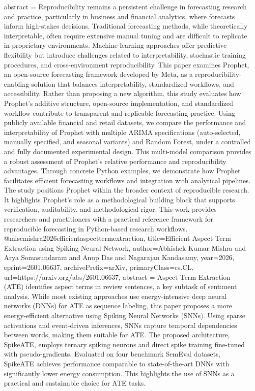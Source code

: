 {      abstract = {Reproducibility remains a persistent challenge in forecasting research and practice, particularly in business and financial analytics, where forecasts inform high-stakes decisions. Traditional forecasting methods, while theoretically interpretable, often require extensive manual tuning and are difficult to replicate in proprietary environments. Machine learning approaches offer predictive flexibility but introduce challenges related to interpretability, stochastic training procedures, and cross-environment reproducibility. This paper examines Prophet, an open-source forecasting framework developed by Meta, as a reproducibility-enabling solution that balances interpretability, standardized workflows, and accessibility. Rather than proposing a new algorithm, this study evaluates how Prophet's additive structure, open-source implementation, and standardized workflow contribute to transparent and replicable forecasting practice. Using publicly available financial and retail datasets, we compare the performance and interpretability of Prophet with multiple ARIMA specifications (auto-selected, manually specified, and seasonal variants) and Random Forest, under a controlled and fully documented experimental design. This multi-model comparison provides a robust assessment of Prophet's relative performance and reproducibility advantages. Through concrete Python examples, we demonstrate how Prophet facilitates efficient forecasting workflows and integration with analytical pipelines. The study positions Prophet within the broader context of reproducible research. It highlights Prophet's role as a methodological building block that supports verification, auditability, and methodological rigor. This work provides researchers and practitioners with a practical reference framework for reproducible forecasting in Python-based research workflows.}
}@misc{mishra2026efficientaspecttermextraction,
      title={Efficient Aspect Term Extraction using Spiking Neural Network}, 
      author={Abhishek Kumar Mishra and Arya Somasundaram and Anup Das and Nagarajan Kandasamy},
      year={2026},
      eprint={2601.06637},
      archivePrefix={arXiv},
      primaryClass={cs.CL},
      url={https://arxiv.org/abs/2601.06637},
      abstract = {Aspect Term Extraction (ATE) identifies aspect terms in review sentences, a key subtask of sentiment analysis. While most existing approaches use energy-intensive deep neural networks (DNNs) for ATE as sequence labeling, this paper proposes a more energy-efficient alternative using Spiking Neural Networks (SNNs). Using sparse activations and event-driven inferences, SNNs capture temporal dependencies between words, making them suitable for ATE. The proposed architecture, SpikeATE, employs ternary spiking neurons and direct spike training fine-tuned with pseudo-gradients. Evaluated on four benchmark SemEval datasets, SpikeATE achieves performance comparable to state-of-the-art DNNs with significantly lower energy consumption. This highlights the use of SNNs as a practical and sustainable choice for ATE tasks.}
}
